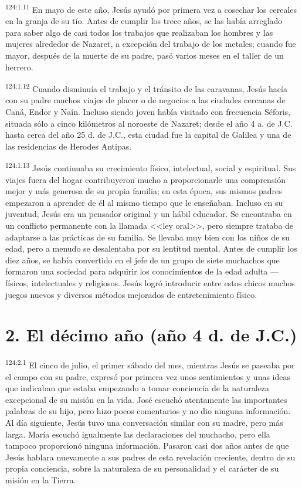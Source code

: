 \par 
\textsuperscript{124:1.11} En mayo de este año, Jesús ayudó por primera vez a cosechar los cereales en la granja de su tío. Antes de cumplir los trece años, se las había arreglado para saber algo de casi todos los trabajos que realizaban los hombres y las mujeres alrededor de Nazaret, a excepción del trabajo de los metales; cuando fue mayor, después de la muerte de su padre, pasó varios meses en el taller de un herrero.

\par 
\textsuperscript{124:1.12} Cuando disminuía el trabajo y el tránsito de las caravanas, Jesús hacía con su padre muchos viajes de placer o de negocios a las ciudades cercanas de Caná, Endor y Naín. Incluso siendo joven había visitado con frecuencia Séforis, situada sólo a cinco kilómetros al noroeste de Nazaret; desde el año 4 a. de J.C. hasta cerca del año 25 d. de J.C., esta ciudad fue la capital de Galilea y una de las residencias de Herodes Antipas.

\par 
\textsuperscript{124:1.13} Jesús continuaba su crecimiento físico, intelectual, social y espiritual. Sus viajes fuera del hogar contribuyeron mucho a proporcionarle una comprensión mejor y más generosa de su propia familia; en esta época, sus mismos padres empezaron a aprender de él al mismo tiempo que le enseñaban. Incluso en su juventud, Jesús era un pensador original y un hábil educador. Se encontraba en un conflicto permanente con la llamada <<ley oral>>, pero siempre trataba de adaptarse a las prácticas de su familia. Se llevaba muy bien con los niños de su edad, pero a menudo se desalentaba por su lentitud mental. Antes de cumplir los diez años, se había convertido en el jefe de un grupo de siete muchachos que formaron una sociedad para adquirir los conocimientos de la edad adulta ---físicos, intelectuales y religiosos. Jesús logró introducir entre estos chicos muchos juegos nuevos y diversos métodos mejorados de entretenimiento físico.

\section*{2. El décimo año (año 4 d. de J.C.)}
\par 
\textsuperscript{124:2.1} El cinco de julio, el primer sábado del mes, mientras Jesús se paseaba por el campo con su padre, expresó por primera vez unos sentimientos y unas ideas que indicaban que estaba empezando a tomar conciencia de la naturaleza excepcional de su misión en la vida. José escuchó atentamente las importantes palabras de su hijo, pero hizo pocos comentarios y no dio ninguna información. Al día siguiente, Jesús tuvo una conversación similar con su madre, pero más larga. María escuchó igualmente las declaraciones del muchacho, pero ella tampoco proporcionó ninguna información. Pasaron casi dos años antes de que Jesús hablara nuevamente a sus padres de esta revelación creciente, dentro de su propia conciencia, sobre la naturaleza de su personalidad y el carácter de su misión en la Tierra.

